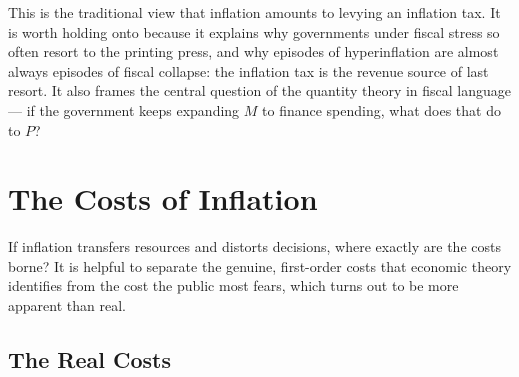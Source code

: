 
This is the traditional view that inflation amounts to levying an inflation tax. It is worth holding onto because it explains why governments under fiscal stress so often resort to the printing press, and why episodes of hyperinflation are almost always episodes of fiscal collapse: the inflation tax is the revenue source of last resort. It also frames the central question of the quantity theory in fiscal language --- if the government keeps expanding $M$ to finance spending, what does that do to $P$?

\section{The Costs of Inflation}

If inflation transfers resources and distorts decisions, where exactly are the costs borne? It is helpful to separate the genuine, first-order costs that economic theory identifies from the cost the public most fears, which turns out to be more apparent than real.

\subsection{The Real Costs}

